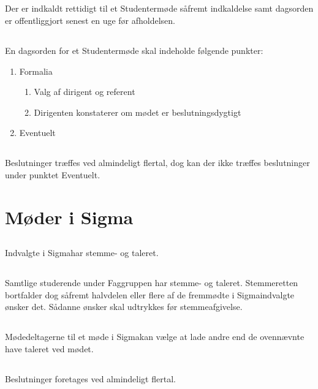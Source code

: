 \documentclass[danish,a4paper,twocolumn]{article}
\newcommand{\foreningen}{Sigma}
\begin{document}
\subsection{}\label{stk:studmd-rettidig}Der er indkaldt rettidigt til et Studentermøde såfremt indkaldelse samt dagsorden er offentliggjort senest en uge før afholdelsen.
\subsection{}En dagsorden for et Studentermøde skal indeholde følgende punkter:
\begin{enumerate}
        \item Formalia
        \begin{enumerate}
                \item Valg af dirigent og referent
                \item Dirigenten konstaterer om mødet er beslutningsdygtigt
        \end{enumerate}
        \item Eventuelt
\end{enumerate}
\subsection{}Beslutninger træffes ved almindeligt flertal, dog kan der ikke træffes beslutninger under punktet Eventuelt.

\section{Møder i \foreningen}\label{par:sigmamdr}
\subsection{}Indvalgte i \foreningen har stemme- og taleret.
\subsection{}Samtlige studerende under Faggruppen har stemme- og taleret. Stemmeretten bortfalder dog såfremt halvdelen eller flere af de fremmødte i \foreningen indvalgte ønsker det. Sådanne ønsker skal udtrykkes før stemmeafgivelse.
\subsection{}Mødedeltagerne til et møde i \foreningen kan vælge at lade andre end de ovennævnte have taleret ved mødet.
\subsection{}Beslutninger foretages ved almindeligt flertal.
\end{document}
